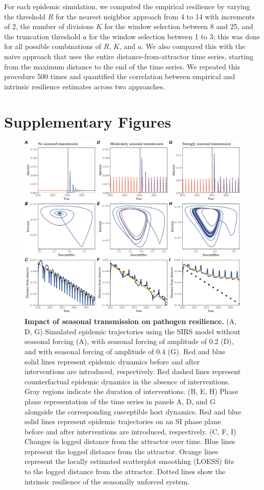 \documentclass[12pt]{article}
\begin{document}
For each epidemic simulation, we computed the empirical resilience by varying the threshold $R$ for the nearest neighbor approach from 4 to 14 with increments of 2, the number of divisions $K$ for the window selection between 8 and 25, and the truncation threshold $a$ for the window selection between 1 to 3;
this was done for all possible combinations of $R$, $K$, and $a$.
We also compared this with the naive approach that uses the entire distance-from-attractor time series, starting from the maximum distance to the end of the time series.
We repeated this procedure 500 times and quantified the correlation between empirical and intrinsic resilience estimates across two approaches.

\pagebreak

\section*{Supplementary Figures}

\begin{figure}[!th]
\includegraphics[width=\textwidth]{../figure2/figure2_simple_seas.pdf}
\caption{
\textbf{Impact of seasonal transmission on pathogen resilience.}
(A, D, G) Simulated epidemic trajectories using the SIRS model without seasonal forcing (A), with seasonal forcing of amplitude of 0.2 (D), and with seasonal forcing of amplitude of 0.4 (G).
Red and blue solid lines represent epidemic dynamics before and after interventions are introduced, respectively.
Red dashed lines represent counterfactual epidemic dynamics in the absence of interventions.
Gray regions indicate the duration of interventions.
(B, E, H) Phase plane representation of the time series in panels A, D, and G alongside the corresponding susceptible host dynamics.
Red and blue solid lines represent epidemic trajectories on an SI phase plane before and after interventions are introduced, respectively.
(C, F, I) Changes in logged distance from the attractor over time.
Blue lines represent the logged distance from the attractor.
Orange lines represent the locally estimated scatterplot smoothing (LOESS) fits to the logged distance from the attractor.
Dotted lines show the intrinsic resilience of the seasonally unforced system.
}
\end{figure}
\end{document}

